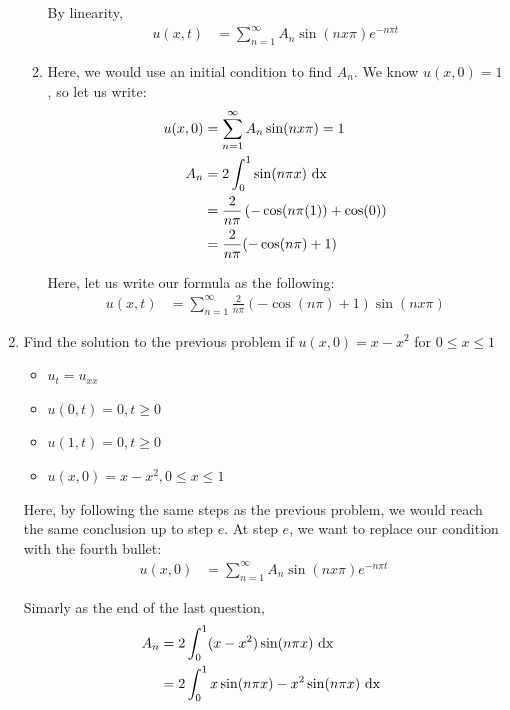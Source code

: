 \documentclass{article}
\begin{document}
\begin{enumerate}
\begin{enumerate}
  By linearity,
  \begin{align}
    u(x, t) & =
    \sum^\infty_{n = 1}
    A_n
    \sin(n x \pi)
    e^{-n \pi t}
  \end{align}
  \item Here, we would use an initial condition to find $A_n$. We know $u(x, 0) = 1$, so let us write:
  \begin{align}
    u(x, 0) & =
    \sum^\infty_{n = 1}
    A_n
    \sin(n x \pi)
    = 1\\
    A_n & = 2 \int^1_0 \sin(n \pi x) \text{ dx }\\
    & = \frac{2}{n \pi} \left( -\cos(n \pi (1)) + \cos(0) \right)\\
    & = \frac{2}{n \pi} (-\cos(n \pi) + 1)
  \end{align}

  Here, let us write our formula as the following:
  \begin{align}
    u(x, t) & = \sum^\infty_{n = 1} \frac{2}{n \pi}(-\cos(n \pi) + 1)\sin(n x \pi)
  \end{align}
\end{enumerate}

\newpage
%
%
\item Find the solution to the previous problem if $u(x, 0) = x - x^2$ for $0 \leq x \leq 1$

\begin{itemize}
  \item $u_t = u_{xx}$
  \item $u(0, t) = 0, t \geq 0$
  \item $u(1, t) = 0, t \geq 0$
  \item $u(x, 0) = x - x^2, 0 \leq x \leq 1$
\end{itemize}

Here, by following the same steps as the previous problem, we would reach the same conclusion up to step $e$. At step $e$, we want to replace our condition with the fourth bullet:
%
\begin{align}
  u(x, 0) & = \sum^\infty_{n = 1} A_n \sin(n x \pi)e^{-n \pi t}
\end{align}

Simarly as the end of the last question,
%
\begin{align}
  A_n & = 2 \int^1_0 (x-x^2) \sin(n \pi x) \text{ dx }\\
  & = 2 \int^1_0 x\sin(n \pi x) - x^2\sin(n \pi x) \text{ dx }
\end{align}


\end{enumerate}
\end{document}
